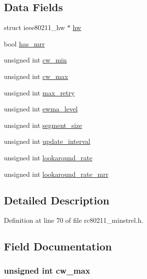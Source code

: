 \subsection*{Data Fields}
\begin{DoxyCompactItemize}
\item 
struct ieee80211\-\_\-hw $\ast$ \hyperlink{structminstrel__priv_aa12d77b0381baac0e9692c9a7a108d72}{hw}
\item 
bool \hyperlink{structminstrel__priv_a0ee069a8859cfa7d2af69c0a0527c29a}{has\-\_\-mrr}
\item 
unsigned int \hyperlink{structminstrel__priv_a5dfb3e843935ac3ab5af58d5b1626233}{cw\-\_\-min}
\item 
unsigned int \hyperlink{structminstrel__priv_a92daed595e977d0ba21e116f1ddeea93}{cw\-\_\-max}
\item 
unsigned int \hyperlink{structminstrel__priv_adab4257a07e2dc9f570cdd27160d9608}{max\-\_\-retry}
\item 
unsigned int \hyperlink{structminstrel__priv_a15186641e34e1ec343ccc43ee048ff07}{ewma\-\_\-level}
\item 
unsigned int \hyperlink{structminstrel__priv_a2d3f8a202a939940631624d4df515a8b}{segment\-\_\-size}
\item 
unsigned int \hyperlink{structminstrel__priv_a09d248b46f6ec43755860c9e20b8e142}{update\-\_\-interval}
\item 
unsigned int \hyperlink{structminstrel__priv_a663907806648ad048461b7d164a15632}{lookaround\-\_\-rate}
\item 
unsigned int \hyperlink{structminstrel__priv_a4b6e6fdf3f72ff420da912ed94ee8086}{lookaround\-\_\-rate\-\_\-mrr}
\end{DoxyCompactItemize}


\subsection{Detailed Description}


Definition at line 70 of file rc80211\-\_\-minstrel.\-h.



\subsection{Field Documentation}
\hypertarget{structminstrel__priv_a92daed595e977d0ba21e116f1ddeea93}{
\subsubsection[{cw\-\_\-max}]{\setlength{\rightskip}{0pt plus 5cm}unsigned int cw\-\_\-max}}\label{structminstrel__priv_a92daed595e977d0ba21e116f1ddeea93}


